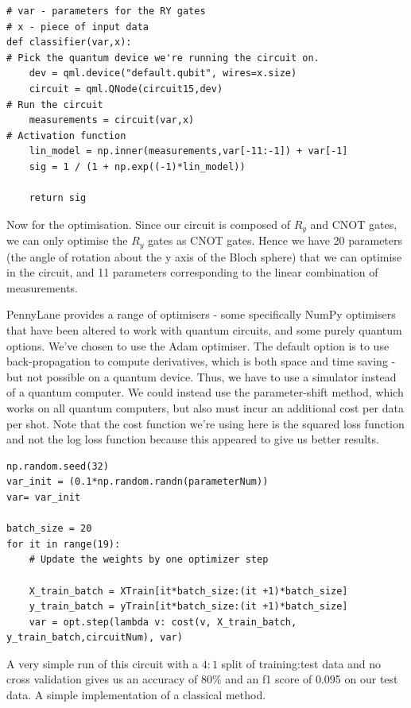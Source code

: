 \documentclass{article}
\theoremstyle{definition}
\begin{document}
\begin{verbatim}
# var - parameters for the RY gates
# x - piece of input data
def classifier(var,x):
# Pick the quantum device we're running the circuit on.
    dev = qml.device("default.qubit", wires=x.size)
    circuit = qml.QNode(circuit15,dev)
# Run the circuit
    measurements = circuit(var,x)
# Activation function
    lin_model = np.inner(measurements,var[-11:-1]) + var[-1] 
    sig = 1 / (1 + np.exp((-1)*lin_model))

    return sig
\end{verbatim}

Now for the optimisation. Since our circuit is composed of $R_y$ and CNOT gates, we can only optimise the $R_y$ gates as CNOT gates. Hence we have 20 parameters (the angle of rotation about the y axis of the Bloch sphere) that we can optimise in the circuit, and 11 parameters corresponding to the linear combination of measurements.

PennyLane provides a range of optimisers - some specifically NumPy optimisers that have been altered to work with quantum circuits, and some purely quantum options. We've chosen to use the Adam optimiser. The default option is to use back-propagation to compute derivatives, which is both space and time saving - but not possible on a quantum device. Thus, we have to use a simulator instead of a quantum computer. We could instead use the parameter-shift method, which works on all quantum computers, but also must incur an additional cost per data per shot. Note that the cost function we're using here is the squared loss function and not the log loss function because this appeared to give us better results. 

\begin{verbatim}
np.random.seed(32)
var_init = (0.1*np.random.randn(parameterNum))
var= var_init 

batch_size = 20
for it in range(19):
    # Update the weights by one optimizer step

    X_train_batch = XTrain[it*batch_size:(it +1)*batch_size]
    y_train_batch = yTrain[it*batch_size:(it +1)*batch_size]
    var = opt.step(lambda v: cost(v, X_train_batch, y_train_batch,circuitNum), var)
\end{verbatim}

A very simple run of this circuit with a $4:1$ split of training:test data and no cross validation gives us an accuracy of 80\% and an f1 score of 0.095 on our test data. A simple implementation of a classical method. 
\end{document}
